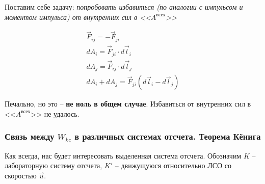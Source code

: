 \documentclass[a4paper,12pt]{extarticle}
\begin{document}
Поставим себе задачу: \textit{попробовать избавиться (по аналогии с импульсом и моментом импульса) от внутренних сил в <<$A^\text{всех}$>>}

\begin{figure}[H]
\begin{center}
\begin{minipage}[h]{0.49\linewidth}
	\centering
	\end{minipage}
\hfill 
\begin{minipage}[h]{0.49\linewidth}
\begin{gather}
	\vec{F}_{ij}=-\vec{F}_{ji}\\
	dA_i=\vec{F}_{ji}\cdot d\vec{l}_i\\
	dA_j=\vec{F}_{ij}\cdot d\vec{l}_j\\
	dA_i+dA_j=\vec{F}_{ji}(d\vec{l}_i-d\vec{l}_j)
\end{gather}
\end{minipage}
\end{center}
\end{figure}
Печально, но это -- \textbf{не ноль в общем случае}. Избавиться от внутренних сил в <<$A^\text{всех}$>> не удалось.

\subsubsection{Связь между $W_{kc}$ в различных системах отсчета. Теорема Кёнига}
    
Как всегда, нас будет интересовать выделенная система отсчета. Обозначим $K$ -- лабораторную систему отсчета, $K'$ -- движущуюся относительно ЛСО со скоростью $\vec{u}$.

\begin{figure}[H]
    \centering
{}
\end{figure}
\end{document}
